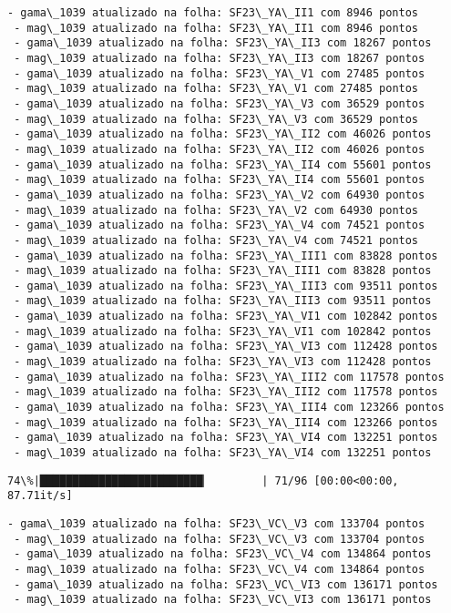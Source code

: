\documentclass[11pt]{article}
\begin{document}
    \begin{Verbatim}[commandchars=\\\{\}]
 - gama\_1039 atualizado na folha: SF23\_YA\_II1 com 8946 pontos
 - mag\_1039 atualizado na folha: SF23\_YA\_II1 com 8946 pontos
 - gama\_1039 atualizado na folha: SF23\_YA\_II3 com 18267 pontos
 - mag\_1039 atualizado na folha: SF23\_YA\_II3 com 18267 pontos
 - gama\_1039 atualizado na folha: SF23\_YA\_V1 com 27485 pontos
 - mag\_1039 atualizado na folha: SF23\_YA\_V1 com 27485 pontos
 - gama\_1039 atualizado na folha: SF23\_YA\_V3 com 36529 pontos
 - mag\_1039 atualizado na folha: SF23\_YA\_V3 com 36529 pontos
 - gama\_1039 atualizado na folha: SF23\_YA\_II2 com 46026 pontos
 - mag\_1039 atualizado na folha: SF23\_YA\_II2 com 46026 pontos
 - gama\_1039 atualizado na folha: SF23\_YA\_II4 com 55601 pontos
 - mag\_1039 atualizado na folha: SF23\_YA\_II4 com 55601 pontos
 - gama\_1039 atualizado na folha: SF23\_YA\_V2 com 64930 pontos
 - mag\_1039 atualizado na folha: SF23\_YA\_V2 com 64930 pontos
 - gama\_1039 atualizado na folha: SF23\_YA\_V4 com 74521 pontos
 - mag\_1039 atualizado na folha: SF23\_YA\_V4 com 74521 pontos
 - gama\_1039 atualizado na folha: SF23\_YA\_III1 com 83828 pontos
 - mag\_1039 atualizado na folha: SF23\_YA\_III1 com 83828 pontos
 - gama\_1039 atualizado na folha: SF23\_YA\_III3 com 93511 pontos
 - mag\_1039 atualizado na folha: SF23\_YA\_III3 com 93511 pontos
 - gama\_1039 atualizado na folha: SF23\_YA\_VI1 com 102842 pontos
 - mag\_1039 atualizado na folha: SF23\_YA\_VI1 com 102842 pontos
 - gama\_1039 atualizado na folha: SF23\_YA\_VI3 com 112428 pontos
 - mag\_1039 atualizado na folha: SF23\_YA\_VI3 com 112428 pontos
 - gama\_1039 atualizado na folha: SF23\_YA\_III2 com 117578 pontos
 - mag\_1039 atualizado na folha: SF23\_YA\_III2 com 117578 pontos
 - gama\_1039 atualizado na folha: SF23\_YA\_III4 com 123266 pontos
 - mag\_1039 atualizado na folha: SF23\_YA\_III4 com 123266 pontos
 - gama\_1039 atualizado na folha: SF23\_YA\_VI4 com 132251 pontos
 - mag\_1039 atualizado na folha: SF23\_YA\_VI4 com 132251 pontos
    \end{Verbatim}

    \begin{Verbatim}[commandchars=\\\{\}]
 74\%|█████████████████████████▏        | 71/96 [00:00<00:00, 87.71it/s]
    \end{Verbatim}

    \begin{Verbatim}[commandchars=\\\{\}]
 - gama\_1039 atualizado na folha: SF23\_VC\_V3 com 133704 pontos
 - mag\_1039 atualizado na folha: SF23\_VC\_V3 com 133704 pontos
 - gama\_1039 atualizado na folha: SF23\_VC\_V4 com 134864 pontos
 - mag\_1039 atualizado na folha: SF23\_VC\_V4 com 134864 pontos
 - gama\_1039 atualizado na folha: SF23\_VC\_VI3 com 136171 pontos
 - mag\_1039 atualizado na folha: SF23\_VC\_VI3 com 136171 pontos
    \end{Verbatim}
\end{document}
